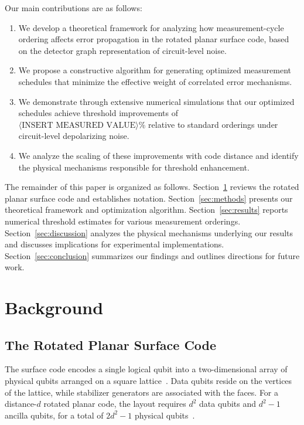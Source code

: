 \documentclass[
    reprint,
    aps,
    prx,
    superscriptaddress,
    longbibliography
]{revtex4-2}
\begin{document}
Our main contributions are as follows:
\begin{enumerate}[label=(\roman*)]
    \item We develop a theoretical framework for analyzing how measurement-cycle ordering affects error propagation in the rotated planar surface code, based on the detector graph representation of circuit-level noise.
    \item We propose a constructive algorithm for generating optimized measurement schedules that minimize the effective weight of correlated error mechanisms.
    \item We demonstrate through extensive numerical simulations that our optimized schedules achieve threshold improvements of $\langle\text{INSERT MEASURED VALUE}\rangle$\% relative to standard orderings under circuit-level depolarizing noise.
    \item We analyze the scaling of these improvements with code distance and identify the physical mechanisms responsible for threshold enhancement.
\end{enumerate}

The remainder of this paper is organized as follows. Section~\ref{sec:background} reviews the rotated planar surface code and establishes notation. Section~\ref{sec:methods} presents our theoretical framework and optimization algorithm. Section~\ref{sec:results} reports numerical threshold estimates for various measurement orderings. Section~\ref{sec:discussion} analyzes the physical mechanisms underlying our results and discusses implications for experimental implementations. Section~\ref{sec:conclusion} summarizes our findings and outlines directions for future work.

\section{Background}
\label{sec:background}

\subsection{The Rotated Planar Surface Code}
\label{subsec:rotated_surface_code}

The surface code encodes a single logical qubit into a two-dimensional array of physical qubits arranged on a square lattice~\cite{Kitaev2003Anyons, Bravyi1998Quantum}. Data qubits reside on the vertices of the lattice, while stabilizer generators are associated with the faces. For a distance-$d$ rotated planar code, the layout requires $d^2$ data qubits and $d^2 - 1$ ancilla qubits, for a total of $2d^2 - 1$ physical qubits~\cite{Horsman2012Surface}.
\end{document}
